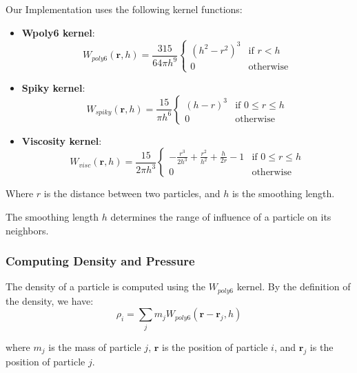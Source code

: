 \documentclass[a4paper]{article}
\begin{document}
Our Implementation uses the following kernel functions:
\begin{itemize}
  \item \textbf{Wpoly6 kernel}:
    \begin{equation}
      \nonumber
      W_{poly6}(\mathbf{r}, h) = \frac{315}{64 \pi h^9} \begin{cases}
        (h^2 - r^2)^3 & \text{if } r < h \\
        0 & \text{otherwise}
      \end{cases}
    \end{equation}
  \item \textbf{Spiky kernel}:
    \begin{equation}
    \nonumber
      W_{spiky}(\mathbf{r}, h) = \frac{15}{\pi h^6} \begin{cases}
        (h - r)^3 & \text{if } 0 \le r \le h \\
        0 & \text{otherwise}
      \end{cases}
    \end{equation}
  \item \textbf{Viscosity kernel}:
    \begin{equation}
    \nonumber
      W_{visc}(\mathbf{r}, h) = \frac{15}{2 \pi h^3} \begin{cases}
        -\frac{r^3}{2h^3} + \frac{r^2}{h^2} + \frac{h}{2r} - 1 & \text{if } 0 \le r \le h \\
        0 & \text{otherwise}
      \end{cases}
    \end{equation}
\end{itemize}

Where $r$ is the distance between two particles, and $h$ is the smoothing length.

The smoothing length $h$ determines the range of influence of a particle on its neighbors.

\subsubsection{Computing Density and Pressure}

The density of a particle is computed using the $W_{poly6}$ kernel. By the definition of the density, we have:
\[
  \rho_i = \sum_{j}m_j W_{poly6}(\mathbf{r} - \mathbf{r}_j, h)
\]

where $m_j$ is the mass of particle $j$, $\mathbf{r}$ is the position of particle $i$, and $\mathbf{r}_j$ is the position of particle $j$.
\end{document}
